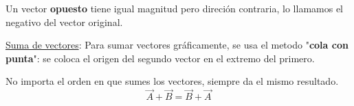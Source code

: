 \documentclass{article}
\newcommand{\bl}[1]{\textbf{#1}}
\begin{document}
    \begin{multicols}{2}
        \centering

        \begin{minipage}[t]{0.6\textwidth}

            \par Un vector \bl{opuesto} tiene igual magnitud pero direción contraria, lo llamamos el negativo del vector original.

        \end{minipage}
        \hfill
        \columnbreak
        \begin{minipage}[t]{0.3\textwidth}

            \begin{figure}[H]
                \centering
				\shorthandoff{>}
                \shorthandoff{>}

            \end{figure}

        \end{minipage}
        
    \end{multicols}

    \par \underline{Suma de vectores}: Para sumar vectores gráficamente, se usa el metodo "\bl{cola con punta}": se coloca el origen del segundo vector en el extremo del primero.
    \begin{figure}[H]
        \centering
		\shorthandoff{>}
        \shorthandoff{>}

    \end{figure}

    \par No importa el orden en que sumes los vectores, siempre da el mismo resultado.
    \[ \vec{A}+\vec{B}=\vec{B}+\vec{A} \]
\end{document}
